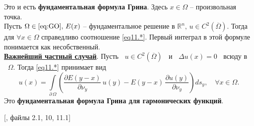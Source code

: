 \noindent Это и есть \textbf{фундаментальная формула Грина}. Здесь $x \in \Omega$ -- произвольная точка.\\

 Пусть $\Omega \in \eqref{eq:GO}, \, E(x)$ -- фундаментальное решение в $\mathbb{R}^n, \, u \in C^2(\overline{\Omega}).$ Тогда для $\forall x \in \Omega$ справедливо соотношение \eqref{eq11.*}. Первый интеграл в этой формуле понимается как несобственный.\\

\noindent \underline{\textbf{Важнейший частный случай}}. Пусть $\;\;u \in C^2(\overline{\Omega})\;\;$ и $\;\;\Delta u(x) = 0\;\;$ всюду\;\; в $\;\;\Omega.$ Тогда \eqref{eq11.*} принимает вид
\begin{equation*}
    u(x) = \int\limits_{\partial \, \Omega} \left ( \frac{\partial E(y-x)}{\partial \nu_y} \, u(y) - E(y-x) \, \frac{\partial u(y)}{\partial \nu_y} \right ) d s_y, \quad \forall x \in \Omega.
\end{equation*}
\noindent Это \textbf{фундаментальная формула Грина для гармонических функций}. 


[\cite{umf_tix}, файлы 2.1, 10, 11.1]